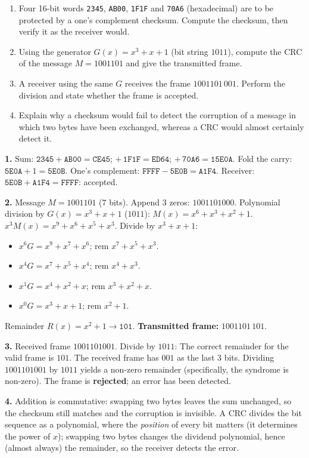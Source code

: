 \documentclass[11pt]{article}
\begin{document}
\begin{exercice}[Practice]
\begin{enumerate}
\item Four 16-bit words \texttt{2345}, \texttt{AB00}, \texttt{1F1F} and \texttt{70A6} (hexadecimal) are to be protected by a one's complement checksum. Compute the checksum, then verify it as the receiver would.
\item Using the generator $G(x) = x^3 + x + 1$ (bit string $1011$), compute the CRC of the message $M = 1001101$ and give the transmitted frame.
\item A receiver using the same $G$ receives the frame $1001101\,001$. Perform the division and state whether the frame is accepted.
\item Explain why a checksum would fail to detect the corruption of a message in which two bytes have been exchanged, whereas a CRC would almost certainly detect it.
\end{enumerate}
\end{exercice}

\begin{corrige}[Exercise 1]
\textbf{1.} Sum: $\texttt{2345} + \texttt{AB00} = \texttt{CE45}$; $+\,\texttt{1F1F} = \texttt{ED64}$; $+\,\texttt{70A6} = \texttt{15E0A}$. Fold the carry: $\texttt{5E0A} + 1 = \texttt{5E0B}$. One's complement: $\texttt{FFFF} - \texttt{5E0B} = \texttt{A1F4}$. Receiver: $\texttt{5E0B} + \texttt{A1F4} = \texttt{FFFF}$: accepted.

\textbf{2.} Message $M = 1001101$ (7 bits). Append 3 zeros: $1001101000$.
Polynomial division by $G(x)=x^3+x+1$ ($1011$):
$M(x) = x^6 + x^3 + x^2 + 1$. $x^3M(x) = x^9 + x^6 + x^5 + x^3$.
Divide by $x^3+x+1$:
\begin{itemize}
\item $x^6 G = x^9 + x^7 + x^6$; rem $x^7 + x^5 + x^3$.
\item $x^4 G = x^7 + x^5 + x^4$; rem $x^4 + x^3$.
\item $x^1 G = x^4 + x^2 + x$; rem $x^3 + x^2 + x$.
\item $x^0 G = x^3 + x + 1$; rem $x^2 + 1$.
\end{itemize}
Remainder $R(x) = x^2 + 1 \rightarrow \texttt{101}$.
\textbf{Transmitted frame:} $1001101\,101$.

\textbf{3.} Received frame $1001101001$. Divide by $1011$:
The correct remainder for the valid frame is $101$. The received frame has $001$ as the last 3 bits.
Dividing $1001101001$ by $1011$ yields a non-zero remainder (specifically, the syndrome is non-zero). The frame is \textbf{rejected}; an error has been detected.

\textbf{4.} Addition is commutative: swapping two bytes leaves the sum unchanged, so the checksum still matches and the corruption is invisible. A CRC divides the bit sequence as a polynomial, where the \emph{position} of every bit matters (it determines the power of $x$); swapping two bytes changes the dividend polynomial, hence (almost always) the remainder, so the receiver detects the error.
\end{corrige}
\end{document}
